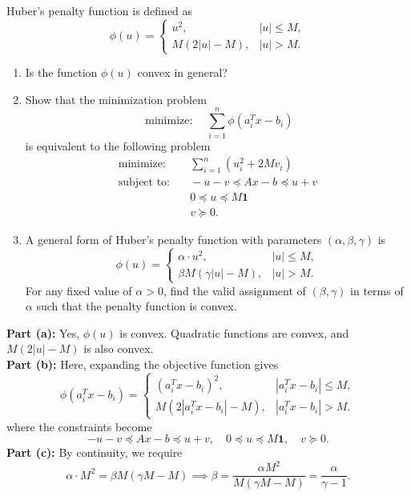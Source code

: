 \documentclass[11pt]{article}
\DeclareMathOperator{\minimize}{minimize:}
\DeclareMathOperator{\subjectto}{subject\ to:}
\begin{document}
\begin{homeworkProblem}
    Huber's penalty function is defined as
    \[
        \phi(u) =
        \begin{cases}
            u^2,         & |u| \leq M, \\
            M(2|u| - M), & |u| > M.
        \end{cases}
    \]
    \begin{enumerate}[label=(\alph*), topsep=5pt, itemsep=5pt]
        \item Is the function $\phi(u)$ convex in general?
        \item Show that the minimization problem
              \[
                  \minimize \quad \sum_{i=1}^{n} \phi(a_i^T x - b_i)
              \]
              is equivalent to the following problem
              \begin{align*}
                  \minimize  & \quad  \sum_{i=1}^{n} (u_i^2 + 2M v_i)     \\
                  \subjectto & \quad  -u - v \preceq Ax - b \preceq u + v \\
                             & \quad  0 \preceq u \preceq M\mathbf{1}     \\
                             & \quad  v \succeq 0.
              \end{align*}
        \item A general form of Huber's penalty function with parameters $(\alpha, \beta, \gamma)$ is
              \[
                  \phi(u) = \begin{cases}
                      \alpha \cdot u^2,         & |u| \leq M, \\
                      \beta M (\gamma |u| - M), & |u| > M .
                  \end{cases}
              \]
              For any fixed value of $\alpha > 0$, find the valid assignment of $(\beta, \gamma)$ in terms of $\alpha$
              such that the penalty function is convex. \\
    \end{enumerate}

    \solution

    \textbf{Part (a):} Yes, $\phi(u)$ is convex. Quadratic functions are convex, and $M(2|u| - M)$ is also convex. \\

    \textbf{Part (b):} Here, expanding the objective function gives
    \[
        \phi(a_i^T x - b_i) = \begin{cases}
            (a_i^T x - b_i)^2,       & |a_i^T x - b_i| \leq M, \\
            M(2|a_i^T x - b_i| - M), & |a_i^T x - b_i| > M.
        \end{cases}
    \] where the constraints become
    \[
        -u - v \preceq Ax - b \preceq u + v, \quad 0 \preceq u \preceq M\mathbf{1}, \quad v \succeq 0.
    \]
    \textbf{Part (c):} By continuity, we require \[
        \alpha \cdot M^2 = \beta M (\gamma M - M) \implies \beta = \frac{\alpha M^2}{M(\gamma M - M)} = \frac{\alpha}{\gamma - 1}.
    \]

\end{homeworkProblem}
\end{document}
